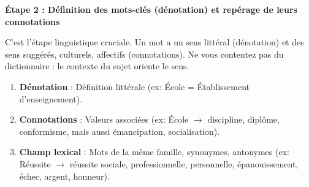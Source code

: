 \documentclass[11pt]{article}
\begin{document}
\textbf{Étape 2 : Définition des mots-clés (dénotation) et repérage de leurs connotations}\par
C'est l'étape linguistique cruciale. Un mot a un sens littéral (dénotation) et des sens suggérés, culturels, affectifs (connotations). Ne vous contentez pas du dictionnaire : le contexte du sujet oriente le sens.

\begin{methode}
\begin{enumerate}
    \item \textbf{Dénotation} : Définition littérale (ex: \og École \fg{} = Établissement d'enseignement).
    \item \textbf{Connotations} : Valeurs associées (ex: \og École \fg{} $\rightarrow$ discipline, diplôme, conformisme, mais aussi émancipation, socialisation).
    \item \textbf{Champ lexical} : Mots de la même famille, synonymes, antonymes (ex: \og Réussite \fg{} $\rightarrow$ réussite sociale, professionnelle, personnelle, épanouissement, échec, argent, honneur).
\end{enumerate}
\end{methode}
\end{document}
